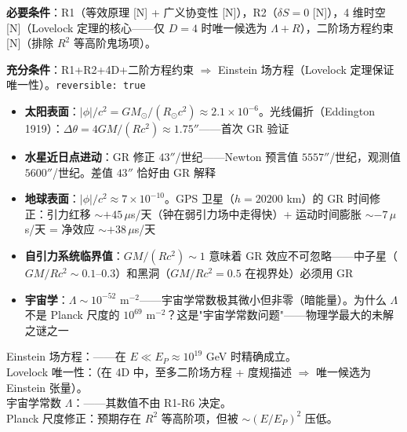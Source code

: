 \textbf{必要条件}：R1（等效原理 [N] + 广义协变性 [N]），R2（$\delta S=0$ [N]），4 维时空 [N]（Lovelock 定理的核心——仅 $D=4$ 时唯一候选为 $\Lambda+R$），二阶场方程约束 [N]（排除 $R^2$ 等高阶鬼场项）。

\textbf{充分条件}：R1+R2+4D+二阶方程约束 $\Rightarrow$ Einstein 场方程（Lovelock 定理保证唯一性）。\texttt{reversible: true}


\begin{oombox}
  \begin{itemize}
    \item \textbf{太阳表面}：$|\phi|/c^2 = GM_\odot/(R_\odot c^2) \approx 2.1\times 10^{-6}$。光线偏折（Eddington 1919）：$\Delta\theta = 4GM/(Rc^2) \approx 1.75''$——首次 GR 验证
    \item \textbf{水星近日点进动}：GR 修正 $43''$/世纪——Newton 预言值 $5557''$/世纪，观测值 $5600''$/世纪。差值 $43''$ 恰好由 GR 解释
    \item \textbf{地球表面}：$|\phi|/c^2 \approx 7\times 10^{-10}$。GPS 卫星（$h=20200$ km）的 GR 时间修正：引力红移 $\sim +45\,\mu$s/天（钟在弱引力场中走得快）+ 运动时间膨胀 $\sim -7\,\mu$s/天 = 净效应 $\sim +38\,\mu$s/天
    \item \textbf{自引力系统临界值}：$GM/(Rc^2) \sim 1$ 意味着 GR 效应不可忽略——中子星（$GM/Rc^2 \sim 0.1$--$0.3$）和黑洞（$GM/Rc^2 = 0.5$ 在视界处）必须用 GR
    \item \textbf{宇宙学}：$\Lambda \sim 10^{-52}$ m$^{-2}$——宇宙学常数极其微小但非零（暗能量）。为什么 $\Lambda$ 不是 Planck 尺度的 $10^{69}$ m$^{-2}$？这是"宇宙学常数问题"——物理学最大的未解之谜之一
  \end{itemize}
\end{oombox}

\precisionbox[GR 精度等级]
  Einstein 场方程：\preceffective——在 $E \ll E_P \approx 10^{19}$ GeV 时精确成立。\\
  Lovelock 唯一性：\precexact（在 4D 中，至多二阶场方程 + 度规描述 $\Rightarrow$ 唯一候选为 Einstein 张量）。\\
  宇宙学常数 $\Lambda$：\preccontingent——其数值不由 R1-R6 决定。\\
   Planck 尺度修正：预期存在 $R^2$ 等高阶项，但被 $\sim (E/E_P)^2$ 压低。
\endprecisionbox

